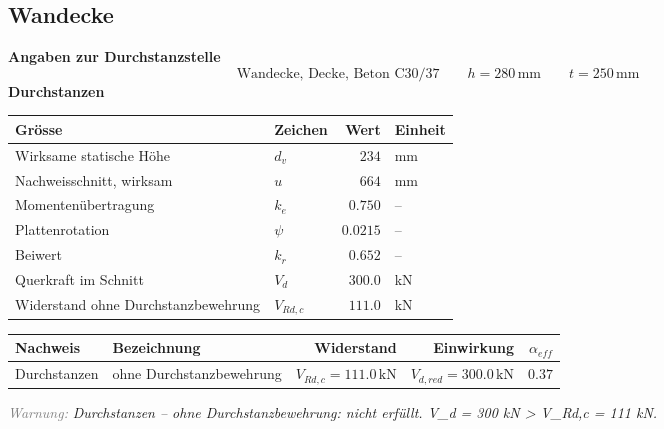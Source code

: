 \documentclass[11pt,a4paper]{article}
\newcommand{\hinweis}[2]{\par\noindent\textcolor{gray}{\textit{#1:}} \textit{#2}\par}
\begin{document}
\subsection{Wandecke}
\noindent\textbf{Angaben zur Durchstanzstelle}
\begin{equation*}
\text{Wandecke, Decke, Beton C30/37} \qquad h = 280\,\mathrm{mm} \qquad t = 250\,\mathrm{mm}
\end{equation*}
\noindent\textbf{Durchstanzen}
\begin{longtable}{llrl}
\hline
Grösse & Zeichen & Wert & Einheit \\
\hline
\endhead
Wirksame statische Höhe & $d_v$ & $234$ & mm \\
Nachweisschnitt, wirksam & $u$ & $664$ & mm \\
Momentenübertragung & $k_e$ & $0.750$ & – \\
Plattenrotation & $\psi$ & $0.0215$ & – \\
Beiwert & $k_r$ & $0.652$ & – \\
Querkraft im Schnitt & $V_d$ & $300.0$ & kN \\
Widerstand ohne Durchstanzbewehrung & $V_{Rd,c}$ & $111.0$ & kN \\
\hline
\end{longtable}
\begin{xltabular}{\linewidth}{>{\raggedright\arraybackslash}X>{\raggedright\arraybackslash}Xrrr}
\hline
Nachweis & Bezeichnung & Widerstand & Einwirkung & $\alpha_{eff}$ \\
\hline
\endhead
Durchstanzen & ohne Durchstanzbewehrung & $V_{Rd,c} = 111.0\,\mathrm{kN}$ & $V_{d,red} = 300.0\,\mathrm{kN}$ & $0.37$ \\
\hline
\end{xltabular}
\hinweis{Warnung}{Durchstanzen – ohne Durchstanzbewehrung: nicht erfüllt. V\_d = 300 kN > V\_Rd,c = 111 kN.}
\end{document}

